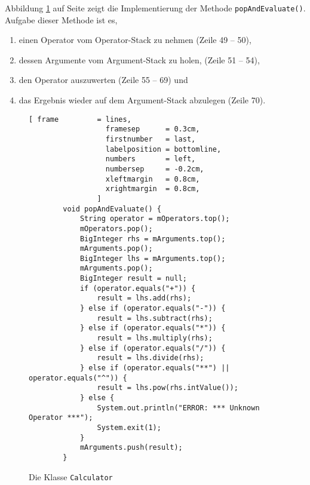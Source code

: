 Abbildung \ref{fig:calculator2.java} auf Seite \pageref{fig:calculator2.java} zeigt die
Implementierung der Methode \texttt{popAndEvaluate()}.
Aufgabe dieser Methode ist es, 
\begin{enumerate}
\item einen Operator vom Operator-Stack zu nehmen (Zeile 49 -- 50), 
\item dessen Argumente vom Argument-Stack zu holen, (Zeile 51 -- 54),
\item den Operator auszuwerten (Zeile 55 -- 69) und
\item das Ergebnis wieder auf dem Argument-Stack abzulegen (Zeile 70).
\end{enumerate}
\begin{figure}[!h]
  \centering
\begin{Verbatim}[ frame         = lines, 
                  framesep      = 0.3cm, 
                  firstnumber   = last,
                  labelposition = bottomline,
                  numbers       = left,
                  numbersep     = -0.2cm,
                  xleftmargin   = 0.8cm,
                  xrightmargin  = 0.8cm,
                ]
        void popAndEvaluate() {
            String operator = mOperators.top();
            mOperators.pop();
            BigInteger rhs = mArguments.top();
            mArguments.pop();
            BigInteger lhs = mArguments.top();
            mArguments.pop();
            BigInteger result = null;
            if (operator.equals("+")) {
                result = lhs.add(rhs);
            } else if (operator.equals("-")) {
                result = lhs.subtract(rhs);
            } else if (operator.equals("*")) {
                result = lhs.multiply(rhs);
            } else if (operator.equals("/")) {
                result = lhs.divide(rhs);
            } else if (operator.equals("**") || operator.equals("^")) {
                result = lhs.pow(rhs.intValue());       
            } else {
                System.out.println("ERROR: *** Unknown Operator ***");
                System.exit(1);
            }
            mArguments.push(result);
        }
\end{Verbatim}
\vspace*{-0.3cm}
  \caption{Die Klasse \texttt{Calculator}}
  \label{fig:calculator2.java}
\end{figure}

